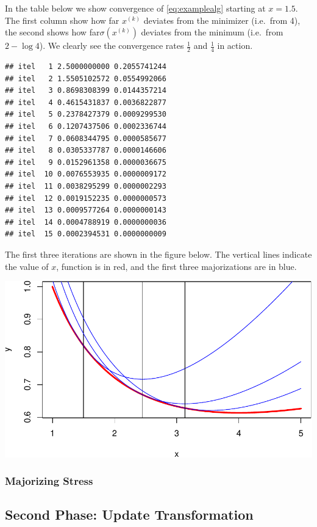 \documentclass[
  12pt,
]{article}
\begin{document}
In the table below we show convergence of \eqref{eq:examplealg} starting
at \(x=1.5\). The first column show how far \(x^{(k)}\) deviates from the
minimizer (i.e.~from 4), the second shows how far\(\sigma(x^{(k)})\)
deviates from the minimum (i.e.~from \(2-\log 4\)). We clearly see the
convergence rates \(\frac12\) and \(\frac14\) in action.

\begin{verbatim}
## itel   1 2.5000000000 0.2055741244 
## itel   2 1.5505102572 0.0554992066 
## itel   3 0.8698308399 0.0144357214 
## itel   4 0.4615431837 0.0036822877 
## itel   5 0.2378427379 0.0009299530 
## itel   6 0.1207437506 0.0002336744 
## itel   7 0.0608344795 0.0000585677 
## itel   8 0.0305337787 0.0000146606 
## itel   9 0.0152961358 0.0000036675 
## itel  10 0.0076553935 0.0000009172 
## itel  11 0.0038295299 0.0000002293 
## itel  12 0.0019152235 0.0000000573 
## itel  13 0.0009577264 0.0000000143 
## itel  14 0.0004788919 0.0000000036 
## itel  15 0.0002394531 0.0000000009
\end{verbatim}

The first three iterations are shown in the figure below. The vertical
lines indicate the value of \(x\), function is in red, and the first three
majorizations are in blue.

\begin{center}\includegraphics{smacofManual_files/figure-latex/majplot-1} \end{center}

\subsubsection{Majorizing Stress}\label{majorizing-stress}

\subsection{Second Phase: Update Transformation}\label{second-phase-update-transformation}
\end{document}
